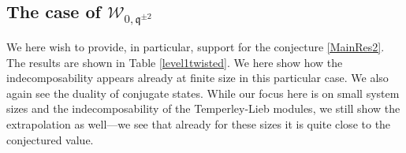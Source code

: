 \documentclass[a4paper,10pt]{article}
\newcommand{\q}{\mathfrak{q}}
\newcommand{\linnea}[1]{$\framebox{\tiny L}$\ \textbf{\texttt{{\color{red}\footnotesize#1}}}}
\newcommand{\aSt}{\mathcal{W}}
\newcommand{\AStTL}[2]{\aSt_{#1,#2}}
\begin{document}
\FloatBarrier

\subsection{The case of $\AStTL{0}{\q^{\pm2}}$}\label{spin_twisted}

We here wish to provide, in particular, support for the conjecture \eqref{MainRes2}.
The results are shown in Table \ref{level1twisted}. %
We here show how the indecomposability appears already at finite size in this particular case. We also again see the duality of conjugate states. While our focus here is on small system sizes and the indecomposability of the Temperley-Lieb modules, we still show the extrapolation as well---we see that already for these sizes it is quite close to the conjectured value. 
\end{document}

